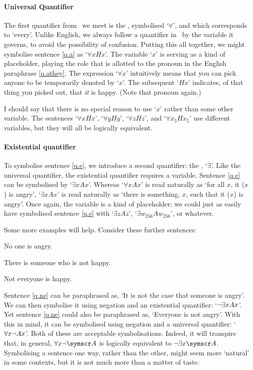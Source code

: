 \paragraph{Universal Quantifier} The first quantifier from \FOL\ we meet is the , symbolised `$\forall$', and which corresponds to `every'. Unlike English, we always follow a quantifier in \FOL\ by the variable it governs, to avoid the possibility of confusion. Putting this all together, we might symbolise sentence \ref{q.a} as `$\forall x Hx$'.  The variable `$x$' is serving as a kind of placeholder, playing the role that is allotted to the pronoun in the English paraphrase \ref{q.athey}. The expression `$\forall x$' intuitively means that you can pick anyone to be temporarily denoted by `$x$'. The subsequent `$Hx$' indicates, of that thing you picked out, that \emph{it} is happy. (Note that pronoun again.)

I should say that there is no special reason to use `$x$' rather than some other variable. The sentences `$\forall x Hx$', `$\forall y Hy$', `$\forall z Hz$', and `$\forall x_5 Hx_5$' use different variables, but they will all be logically equivalent.

\paragraph{Existential quantifier} To symbolise sentence \ref{q.e}, we introduce a second quantifier: the , `$\exists$'. Like the universal quantifier, the existential quantifier requires a variable. Sentence \ref{q.e} can be symbolised by `$\exists x Ax$'. Whereas `$\forall x Ax$' is read naturally as `for all $x$, it ($x$) is angry', `$\exists x Ax$' is read naturally as `there is something, $x$, such that it ($x$) is angry'. Once again, the variable is a kind of placeholder; we could just as easily have symbolised sentence \ref{q.e} with `$\exists z Az$', `$\exists w_{256} Aw_{256}$', or whatever.

Some more examples will help. Consider these further sentences:
	\begin{earg}
		\item[\ex{q.ne}] No one is angry.
		\item[\ex{q.en}] There is someone who is not happy.
		\item[\ex{q.na}] Not everyone is happy.
	\end{earg}
Sentence \ref{q.ne} can be paraphrased as, `It is not the case that someone is angry'. We can then symbolise it using negation and an existential quantifier: `$\neg \exists x Ax$'. Yet sentence \ref{q.ne} could also be paraphrased as, `Everyone is not angry'. With this in mind, it can be symbolised using negation and a universal quantifier: `$\forall x \neg Ax$'. Both of these are acceptable symbolisations.  Indeed, it will transpire that, in general, $\forall x \enot\meta{A}$ is logically equivalent to $\enot\exists x\meta{A}$.  Symbolising a sentence one way, rather than the other, might seem more `natural' in some contexts, but it is not much more than a matter of taste.


